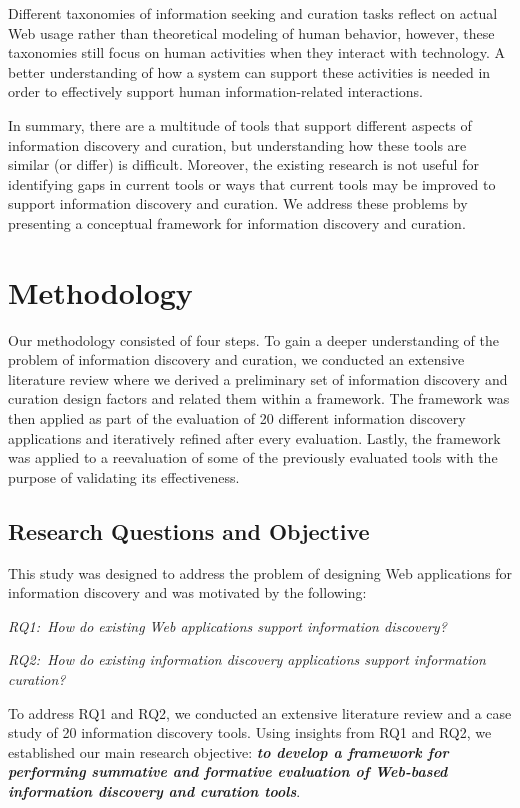 \documentclass[review]{elsarticle}
\begin{document}
Different taxonomies of information seeking and curation tasks reflect on actual Web usage rather than theoretical modeling of human behavior, however, these taxonomies still focus on human activities when they interact with technology. A better understanding of how a system can support these activities is needed in order to effectively support human information-related interactions. 

In summary, there are a multitude of tools that support different aspects of information discovery and curation, but understanding how these tools are similar (or differ) is difficult. Moreover, the existing research is not useful for identifying gaps in current tools or ways that current tools may be improved to support information discovery and curation. We address these problems by presenting a conceptual framework for information discovery and curation.

\section{Methodology}
\label{section:methodology}
Our methodology consisted of four steps. To gain a deeper understanding of the problem of information discovery and curation, we conducted an extensive literature review where we derived a preliminary set of information discovery and curation design factors and related them within a framework. The framework was then applied as part of the evaluation of 20 different information discovery applications and iteratively refined after every evaluation. Lastly, the framework was applied to a reevaluation of some of the previously evaluated tools with the purpose of validating its effectiveness. 

{\subsection{Research Questions and Objective}
This study was designed to address the problem of designing Web applications for information discovery and was motivated by the following:

\emph{RQ1:~How do existing Web applications support information discovery?}

\emph{RQ2:~How do existing information discovery applications support information curation?}

To address RQ1 and RQ2, we conducted an extensive literature review and a case study of 20 information discovery tools. Using insights from RQ1 and RQ2, we established our main research objective: \emph{\textbf{to develop a framework for performing summative and formative evaluation of Web-based information discovery and curation tools}}.

}%
\end{document}
